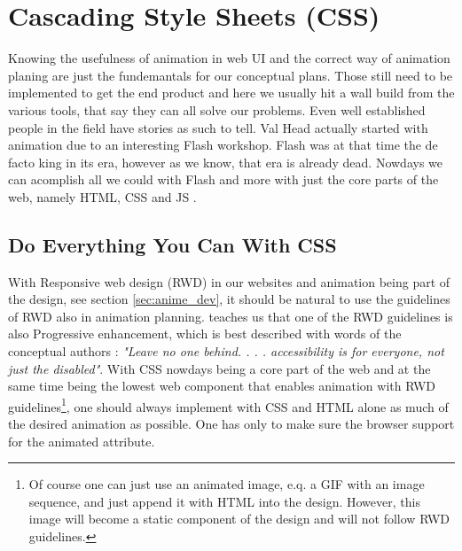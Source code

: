 %
%
% 
% 
% 


\chapter{Cascading Style Sheets (CSS)}

\label{chap:CSS}

Knowing the usefulness of animation in web UI and the correct way of animation planing are just the fundemantals for our conceptual plans. Those still need to be implemented to get the end product and here we usually hit a wall build from the various tools, that say they can all solve our problems. Even well established people in the field have stories as such to tell. Val Head actually started with animation due to an interesting Flash workshop. Flash was at that time the de facto king in its era, however as we know, that era is already dead. Nowdays we can acomplish
all we could with Flash and more with just the core parts of the web, namely HTML, CSS and JS
\citep{head2016designing}.

\section{Do Everything You Can With CSS}

\label{sec:everythingCSS}

With Responsive web design (RWD) in our websites and animation being part of the design, see section \ref{sec:anime_dev}, it should be natural to use the guidelines of RWD also in animation planning. \citet{IAWEB} teaches us that one of the RWD guidelines is also Progressive enhancement, which is best described with words of the conceptual authors \citet{champeon2003inclusive}: {\em"Leave no one behind. . . .  accessibility is for everyone, not just the disabled"}. With CSS nowdays being a core part of the web and at the same time being the lowest web component that enables animation with RWD guidelines\footnote{Of course one can just use an animated image, e.q. a GIF with an image sequence, and just append it with HTML into the design. However, this image will become a static component of the design and will not follow RWD guidelines.}, one should always implement with CSS and HTML alone as much of the desired animation as possible. One has only to make sure the browser support for the animated attribute.

